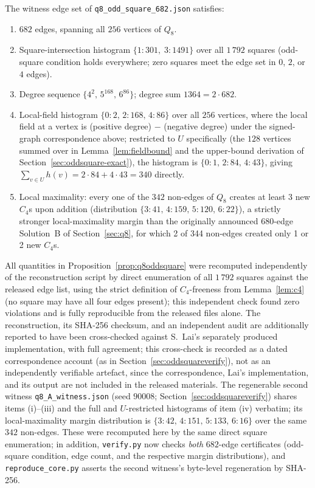 \documentclass[12pt]{article}
\begin{document}
\begin{proposition}\label{prop:q8oddsquare}
The witness edge set of \texttt{q8\_odd\_square\_682.json} satisfies:
\begin{enumerate}[label=(\roman*)]
  \item $682$ edges, spanning all $256$ vertices of $Q_8$.
  \item Square-intersection histogram $\{1\!:\!301,\;3\!:\!1491\}$ over
    all $1\,792$ squares (odd-square condition holds everywhere; zero
    squares meet the edge set in $0$, $2$, or $4$ edges).
  \item Degree sequence $\{4^2,\,5^{168},\,6^{86}\}$; degree sum
    $1364=2\cdot682$.
  \item Local-field histogram $\{0\!:\!2,\,2\!:\!168,\,4\!:\!86\}$ over
    all $256$ vertices, where
    the local field at a vertex is (positive degree) $-$ (negative degree)
    under the signed-graph correspondence above; restricted to $U$
    specifically (the $128$ vertices summed over in
    Lemma~\ref{lem:fieldbound} and the upper-bound derivation of
    Section~\ref{sec:oddsquare-exact}), the histogram is
    $\{0\!:\!1,\,2\!:\!84,\,4\!:\!43\}$, giving
    $\sum_{v\in U}h(v)=2\cdot84+4\cdot43=340$ directly.
  \item Local maximality: every one of the $342$ non-edges of $Q_8$
    creates at least $3$ new $C_4$s upon addition (distribution
    $\{3\!:\!41,\,4\!:\!159,\,5\!:\!120,\,6\!:\!22\}$), a strictly stronger
    local-maximality margin than the originally announced 680-edge
    Solution~B of Section~\ref{sec:q8}, for which 2 of 344 non-edges
    created only 1 or 2 new $C_4$s.
\end{enumerate}
\end{proposition}

All quantities in Proposition~\ref{prop:q8oddsquare} were recomputed
independently of the reconstruction script by direct enumeration of all
$1\,792$ squares against the released edge list, using the strict
definition of $C_4$-freeness from Lemma~\ref{lem:c4} (no square may
have all four edges present); this independent check found zero violations
and is fully reproducible from the released files alone.
The reconstruction, its SHA-256 checksum, and an independent audit are
additionally reported to have been cross-checked against S.~Lai's
separately produced implementation, with full agreement; this
cross-check is recorded as a dated correspondence account (as in
Section~\ref{sec:oddsquareverify}), not as an independently verifiable
artefact, since the correspondence, Lai's implementation, and its
output are not included in the released materials. The regenerable
second witness \texttt{q8\_A\_witness.json} (seed $90008$;
Section~\ref{sec:oddsquareverify}) shares items (i)--(iii) and the full
and $U$-restricted histograms of item (iv) verbatim; its
local-maximality margin distribution is
$\{3{:}42,\,4{:}151,\,5{:}133,\,6{:}16\}$ over the same $342$
non-edges. These were recomputed here by the same direct square
enumeration; in addition, \texttt{verify.py} now checks \emph{both}
$682$-edge certificates (odd-square condition, edge count, and the
respective margin distributions), and \texttt{reproduce\_core.py}
asserts the second witness's byte-level regeneration by SHA-256.
\end{document}
